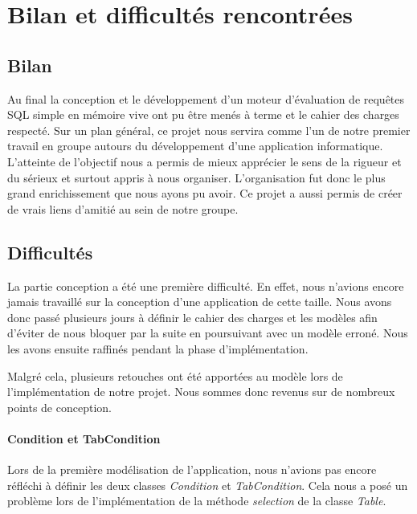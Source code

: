 \documentclass[oneside,13pt,a4paper]{report}
\begin{document}

\chapter{Bilan et difficultés rencontrées}
\section{Bilan}

Au final la conception et le développement d'un moteur d'évaluation de requêtes SQL simple en mémoire vive ont pu être menés à terme et le cahier des charges respecté. Sur un plan général, ce projet nous servira comme l'un de notre premier travail en groupe autours du développement d’une application informatique. L'atteinte de l'objectif nous a permis de mieux apprécier le sens de la rigueur et du sérieux et surtout appris à nous organiser. L'organisation fut donc le plus grand enrichissement que nous ayons pu avoir.
\newline Ce projet a aussi permis de créer de vrais liens d'amitié au sein de notre groupe.

\section{Difficultés}

La partie conception a été une première difficulté. En effet, nous n’avions encore jamais travaillé sur la conception d’une application de cette taille. Nous avons donc passé plusieurs jours à définir le cahier des charges et les modèles afin d’éviter de nous bloquer par la suite en poursuivant avec un modèle erroné. Nous les avons ensuite raffinés pendant la phase d’implémentation.

Malgré cela, plusieurs retouches ont été apportées au modèle lors de l'implémentation de notre projet. Nous sommes donc revenus sur de nombreux points de conception.

\subsubsection{Condition et TabCondition}

Lors de la première modélisation de l'application, nous n'avions pas encore réfléchi à définir les deux classes \textit{Condition} et \textit{TabCondition}. Cela nous a posé un problème lors de l'implémentation de la méthode \textit{selection} de la classe \textit{Table}.
\end{document}
